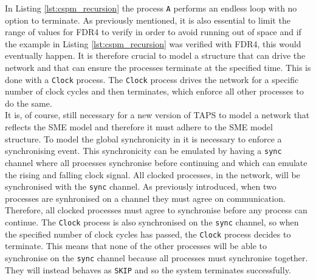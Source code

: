 In Listing \ref{lst:cspm_recursion} the process \texttt{A} performs an endless loop with no option to terminate. As previously mentioned, it is also essential to limit the range of values for FDR4 to verify in order to avoid running out of space and if the example in Listing \ref{lst:cspm_recursion} was verified with FDR4, this would eventually happen. It is therefore crucial to model a structure that can drive the network and that can ensure the processes terminate at the specified time. This is done with a \texttt{Clock} process. The \texttt{Clock} process drives the network for a specific number of clock cycles and then terminates, which enforce all other processes to do the same. \\

It is, of course, still necessary for a new version of TAPS to model a \cspm{} network that reflects the SME model and therefore it must adhere to the SME model structure. To model the global synchronicity in \cspm{} it is necessary to enforce a synchronising event. This synchronicity can be emulated by having a \texttt{sync} channel where all processes synchronise before continuing and which can emulate the rising and falling clock signal. All clocked processes, in the network, will be synchronised with the \texttt{sync} channel. As previously introduced, when two processes are synhronised on a channel they must agree on communication. Therefore, all clocked processes must agree to synchronise before any process can continue.
The \texttt{Clock} process is also synchronised on the \texttt{sync} channel, so when the specified number of clock cycles has passed, the \texttt{Clock} process decides to terminate.
This means that none of the other processes will be able to synchronise on the \texttt{sync} channel because all processes must synchronise together. They will instead behaves as \texttt{SKIP} and so the system terminates successfully.\\

